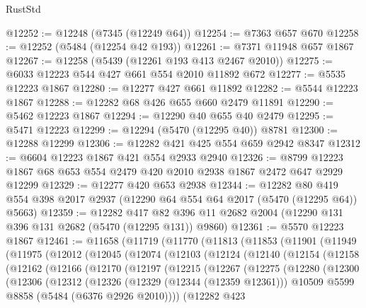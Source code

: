\begin{lexlean}{RustStd}
\begin{coremodule}
@12252 := @12248 (@7345 (@12249 @64))
@12254 := @7363 @657 @670
@12258 := @12252 (@5484 (@12254 @42 @193))
@12261 := @7371 @11948 @657 @1867
@12267 := @12258 (@5439 (@12261 @193 @413 @2467 @2010))
@12275 := @6033 @12223 @544 @427 @661 @554 @2010 @11892 @672
@12277 := @5535 @12223 @1867
@12280 := @12277 @427 @661 @11892
@12282 := @5544 @12223 @1867
@12288 := @12282 @68 @426 @655 @660 @2479 @11891
@12290 := @5462 @12223 @1867
@12294 := @12290 @40 @655 @40 @2479
@12295 := @5471 @12223
@12299 := @12294 (@5470 (@12295 @40)) @8781
@12300 := @12288 @12299
@12306 := @12282 @421 @425 @554 @659 @2942 @8347
@12312 := @6604 @12223 @1867 @421 @554 @2933 @2940
@12326 := @8799 @12223 @1867 @68 @653 @554 @2479 @420 @2010 @2938 @1867 @2472 @647 @2929 @12299
@12329 := @12277 @420 @653 @2938
@12344 := @12282
    @80
    @419
    @554
    @398
    @2017
    @2937
    (@12290 @64 @554 @64 @2017 (@5470 (@12295 @64)) @5663)
@12359 := @12282
    @417
    @82
    @396
    @11
    @2682
    @2004
    (@12290 @131 @396 @131 @2682 (@5470 (@12295 @131)) @9860)
@12361 := @5570 @12223 @1867
@12461 := @11658
    (@11719
      (@11770
        (@11813
          (@11853
            (@11901
              (@11949
                (@11975
                  (@12012
                    (@12045
                      (@12074
                        (@12103
                          (@12124
                            (@12140
                              (@12154
                                (@12158
                                  (@12162
                                    (@12166
                                      (@12170
                                        (@12197
                                          (@12215
                                            (@12267
                                              (@12275
                                                (@12280
                                                  (@12300
                                                    (@12306
                                                      (@12312
                                                        (@12326
                                                          (@12329 (@12344 (@12359 @12361)))
                                                          @10509
                                                          @5599
                                                          @8858
                                                          (@5484 (@6376 @2926 @2010))))
                                                      (@12282
                                                        @423

\end{coremodule}
\end{lexlean}
